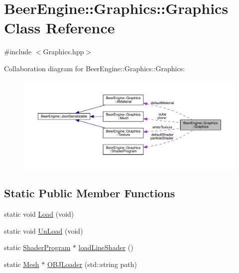 \hypertarget{class_beer_engine_1_1_graphics_1_1_graphics}{}\section{Beer\+Engine\+:\+:Graphics\+:\+:Graphics Class Reference}
\label{class_beer_engine_1_1_graphics_1_1_graphics}


{\ttfamily \#include $<$Graphics.\+hpp$>$}



Collaboration diagram for Beer\+Engine\+:\+:Graphics\+:\+:Graphics\+:
\nopagebreak
\begin{figure}[H]
\begin{center}
\leavevmode
\includegraphics[width=350pt]{class_beer_engine_1_1_graphics_1_1_graphics__coll__graph}
\end{center}
\end{figure}
\subsection*{Static Public Member Functions}
\begin{DoxyCompactItemize}
\item 
static void \mbox{\hyperlink{class_beer_engine_1_1_graphics_1_1_graphics_a87ad2f3a98b4fa5fd453589f7f023701}{Load}} (void)
\item 
static void \mbox{\hyperlink{class_beer_engine_1_1_graphics_1_1_graphics_ab42d214b5a3f69614ad5b9c30d506619}{Un\+Load}} (void)
\item 
static \mbox{\hyperlink{class_beer_engine_1_1_graphics_1_1_shader_program}{Shader\+Program}} $\ast$ \mbox{\hyperlink{class_beer_engine_1_1_graphics_1_1_graphics_a385cbcbf514ef7c22cb4a0ed6f577908}{load\+Line\+Shader}} ()
\item 
static \mbox{\hyperlink{class_beer_engine_1_1_graphics_1_1_mesh}{Mesh}} $\ast$ \mbox{\hyperlink{class_beer_engine_1_1_graphics_1_1_graphics_a0b9081ae33ab8eb0a166c49f70d907ef}{O\+B\+J\+Loader}} (std\+::string path)
\end{DoxyCompactItemize}
